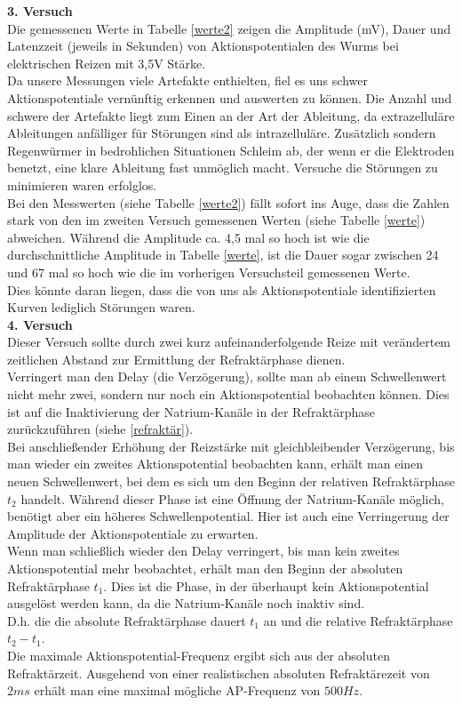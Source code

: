 \documentclass[11pt]{article}
\begin{document}
\textbf{3. Versuch}\\
Die gemessenen Werte in Tabelle \ref{werte2} zeigen die Amplitude (mV), Dauer und Latenzzeit (jeweils in Sekunden) von Aktionspotentialen des Wurms bei elektrischen Reizen mit 3,5V Stärke.\\
Da unsere Messungen viele Artefakte enthielten, fiel es uns schwer Aktionspotentiale vernünftig erkennen und auswerten zu können. Die Anzahl und schwere der Artefakte liegt zum Einen an der Art der Ableitung, da extrazelluläre Ableitungen anfälliger für Störungen sind als intrazelluläre. Zusätzlich sondern Regenwürmer in bedrohlichen Situationen Schleim ab, der wenn er die Elektroden benetzt, eine klare Ableitung fast unmöglich macht. Versuche die Störungen zu minimieren waren erfolglos.\\
Bei den Messwerten (siehe Tabelle \ref{werte2}) fällt sofort ins Auge, dass die Zahlen stark von den im zweiten Versuch gemessenen Werten (siehe Tabelle \ref{werte}) abweichen. Während die Amplitude ca. 4,5 mal so hoch ist wie die durchschnittliche Amplitude in Tabelle \ref{werte}, ist die Dauer sogar zwischen 24 und 67 mal so hoch wie die im vorherigen Versuchsteil gemessenen Werte.\\
Dies könnte daran liegen, dass die von uns als Aktionspotentiale identifizierten Kurven lediglich Störungen waren.\\

\textbf{4. Versuch}\\
Dieser Versuch sollte durch zwei kurz aufeinanderfolgende Reize mit verändertem zeitlichen Abstand zur Ermittlung der Refraktärphase dienen. \\
Verringert man den Delay (die Verzögerung), sollte man ab einem Schwellenwert nicht mehr zwei, sondern nur noch ein Aktionspotential beobachten können. Dies ist auf die Inaktivierung der Natrium-Kanäle in der Refraktärphase zurückzuführen (siehe \ref{refraktär}). \\
Bei anschließender Erhöhung der Reizstärke mit gleichbleibender Verzögerung, bis man wieder ein zweites Aktionspotential beobachten kann, erhält man einen neuen Schwellenwert, bei dem es sich um den Beginn der relativen Refraktärphase $t_2$ handelt. Während dieser Phase ist eine Öffnung der Natrium-Kanäle möglich, benötigt aber ein höheres Schwellenpotential. Hier ist auch eine Verringerung der Amplitude der Aktionspotentiale zu erwarten. \\
Wenn man schließlich wieder den Delay verringert, bis man kein zweites Aktionspotential mehr beobachtet, erhält man den Beginn der absoluten Refraktärphase $t_1$. Dies ist die Phase, in der überhaupt kein Aktionspotential ausgelöst werden kann, da die Natrium-Kanäle noch inaktiv sind. \\
D.h. die die absolute Refraktärphase dauert $t_1$ an und die relative Refraktärphase $t_2-t_1$. \\
Die maximale Aktionspotential-Frequenz ergibt sich aus der absoluten Refraktärzeit. Ausgehend von einer realistischen absoluten Refraktärezeit von $2ms$ erhält man eine maximal mögliche AP-Frequenz von $500Hz$. 
\end{document}
